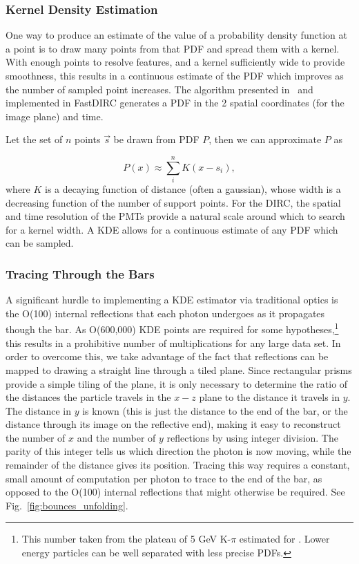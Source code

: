 \subsubsection*{Kernel Density Estimation}

One way to produce an estimate of the value of a probability density function at a point is to draw many points from that PDF and spread them with a kernel.  With enough points to resolve features, and a kernel sufficiently wide to provide smoothness, this results in a continuous estimate of the PDF which improves as the number of sampled point increases.  The algorithm presented in~\cite{Hardin:2016cvu} and implemented in FastDIRC generates a PDF in the 2 spatial coordinates (for the image plane) and time.

Let the set of $n$ points $\vec{s}$ be drawn from PDF $P$, then we can approximate $P$  as

\begin{equation}
P(x) \approx \sum_{i}^{n} K(x - s_{i}),
\label{eq:kernel_form}
\end{equation}
where $K$ is a decaying function of distance (often a gaussian), whose width is a decreasing function of the number of support points.  For the \gluex DIRC, the spatial and time resolution of the PMTs provide a natural scale around which to search for a kernel width.  A KDE allows for a continuous estimate of any PDF which can be sampled.

\subsubsection*{Tracing Through the Bars}
A significant hurdle to implementing a KDE estimator via traditional optics is the O(100) internal reflections that each photon undergoes as it propagates though the bar.  As O(600,000) KDE points are required for some hypotheses,\footnote{This number taken from the plateau of 5 GeV K-$\pi$ estimated for \gluex.  Lower energy particles can be well separated with less precise PDFs.} this results in a prohibitive number of multiplications for any large data set.  In order to overcome this, we take advantage of the fact that reflections can be mapped to drawing a straight line through a tiled plane.  Since rectangular prisms provide a simple tiling of the plane, it is only necessary to determine the ratio of the distances the particle travels in the $x-z$ plane to the distance it travels in $y$.  The distance in $y$ is known (this is just the distance to the end of the bar, or the distance through its image on the reflective end), making it easy to reconstruct the number of $x$ and the number of $y$ reflections by using integer division.  The parity of this integer tells us which direction the photon is now moving, while the remainder of the distance gives its position.  Tracing this way requires a constant, small amount of computation per photon to trace to the end of the bar, as opposed to the O(100) internal reflections that might otherwise be required.  See Fig.~\ref{fig:bounces_unfolding}.

